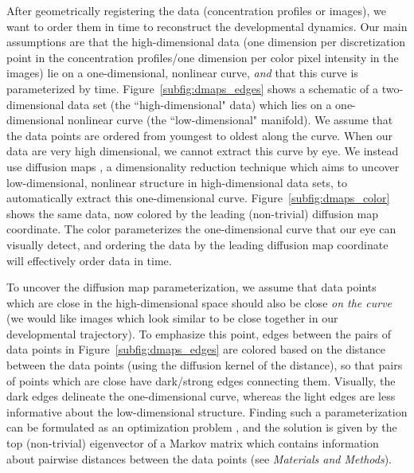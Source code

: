 \documentclass{pnastwo}
\begin{document}
\begin{article}
After geometrically registering the data (concentration profiles or images), we want to order them in time to reconstruct the developmental dynamics.
%
%
Our main assumptions are that the high-dimensional data (one dimension per discretization point in the concentration profiles/one dimension per color pixel intensity in the images) lie on a one-dimensional, nonlinear curve, {\it and} that this curve is parameterized by time.
%
Figure~\ref{subfig:dmaps_edges} shows a schematic of a two-dimensional data set (the ``high-dimensional" data) which lies on a one-dimensional nonlinear curve (the ``low-dimensional" manifold).
%
We assume that the data points are ordered from youngest to oldest along the curve.
%
When our data are very high dimensional, we cannot extract this curve by eye.
%
We instead use diffusion maps \cite{coifman2005geometric}, a dimensionality reduction technique which aims to uncover low-dimensional, nonlinear structure in high-dimensional data sets, to automatically extract this one-dimensional curve.
%
Figure~\ref{subfig:dmaps_color} shows the same data, now colored by the leading (non-trivial) diffusion map coordinate.
%
The color parameterizes the one-dimensional curve that our eye can visually detect, and ordering the data by the leading diffusion map coordinate will effectively order data in time.

To uncover the diffusion map parameterization, we assume that data points which are close in the high-dimensional space should also be close {\it on the curve} (we would like images which look similar to be close together in our developmental trajectory).
%
%
To emphasize this point, edges between the pairs of data points in Figure~\ref{subfig:dmaps_edges} are colored based on the distance between the data points (using the diffusion kernel of the distance), so that pairs of points which are close have dark/strong edges connecting them.
%
Visually, the dark edges delineate the one-dimensional curve, whereas the light edges are less informative about the low-dimensional structure.
%
%
Finding such a parameterization can be formulated as an optimization problem \cite{Belkin2003}, and the solution is given by the top (non-trivial) eigenvector of a Markov matrix which contains information about pairwise distances between the data points (see {\it Materials and Methods}).
%
%


\end{article}
\end{document}
